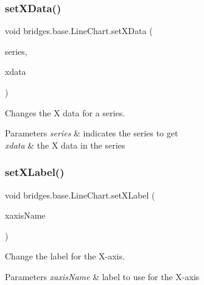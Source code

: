 \subsubsection{\texorpdfstring{set\+X\+Data()}{setXData()}\hspace{0.1cm}{\footnotesize\ttfamily [2/2]}}
{\footnotesize\ttfamily void bridges.\+base.\+Line\+Chart.\+set\+X\+Data (\begin{DoxyParamCaption}\item[{String}]{series,  }\item[{Array\+List$<$ Double $>$}]{xdata }\end{DoxyParamCaption})}



Changes the X data for a series. 


\begin{DoxyParams}{Parameters}
{\em series} & indicates the series to get \\
\hline
{\em xdata} & the X data in the series \\
\hline
\end{DoxyParams}
\mbox{\label{classbridges_1_1base_1_1_line_chart_ab402a1134bb79919860368a234f62ea2}} 
\subsubsection{\texorpdfstring{set\+X\+Label()}{setXLabel()}}
{\footnotesize\ttfamily void bridges.\+base.\+Line\+Chart.\+set\+X\+Label (\begin{DoxyParamCaption}\item[{String}]{xaxis\+Name }\end{DoxyParamCaption})}



Change the label for the X-\/axis. 


\begin{DoxyParams}{Parameters}
{\em xaxis\+Name} & label to use for the X-\/axis \\
\hline
\end{DoxyParams}
\mbox{\label{classbridges_1_1base_1_1_line_chart_a3076dc99debb599529169de40815aba2}} 
